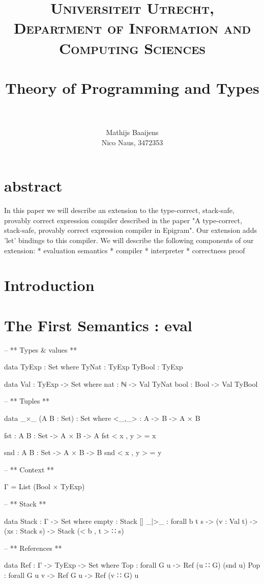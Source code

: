 \documentclass[paper=a4, fontsize=11pt]{scrartcl} %
\title{ 
\normalfont \normalsize 
\textsc{Universiteit Utrecht, Department of Information and Computing Sciences} \\ [25pt] %
\horrule{0.5pt} \\[0.4cm] %
\huge Theory of Programming and Types\\ %
\horrule{2pt} \\[0.5cm] %
}
\author{Mathijs Baaijens\\ Nico Naus, 3472353} %
\numberwithin{equation}{section} %
\numberwithin{figure}{section} %
\numberwithin{table}{section} %
\begin{document}
\maketitle %


\section{abstract}
In this paper we will describe an extension to the type-correct, stack-safe, provably correct expression compiler described in the paper "A type-correct, stack-safe, provably correct expression compiler in Epigram". Our extension adds 'let' bindings to this compiler. We will describe the following components of our extension:
* evaluation semantics
* compiler
* interpreter
* correctness proof

\section{Introduction}
\section{The First Semantics : eval}

-- ** Types & values **

data TyExp : Set where
  TyNat  : TyExp
  TyBool : TyExp

data Val : TyExp -> Set where
  nat : ℕ -> Val TyNat
  bool : Bool -> Val TyBool

-- ** Tuples **

data _×_ (A B : Set) : Set where
  <_,_> : A -> B -> A × B

fst : {A B : Set} -> A × B -> A
fst < x , y > = x

snd : {A B : Set} -> A × B -> B
snd < x , y > = y

-- ** Context **

Γ = List (Bool × TyExp)

-- ** Stack **

data Stack : Γ -> Set where
  empty : Stack []
  _|>_ : forall {b t s} -> (v : Val t) -> (xs : Stack s) -> Stack (< b , t > ∷ s)

-- ** References **

data Ref : Γ -> TyExp -> Set where
 Top : forall {G u} -> Ref (u ∷ G) (snd u)
 Pop : forall {G u v} -> Ref G u -> Ref (v ∷ G) u
\end{document}
